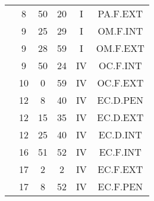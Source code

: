 \documentclass[12pt, a4paper]{article}
\begin{document}
\begin{multicols}{3}
{\begin{tabular}{c c c c c c}
	 	 	 	 & 8 & 50 & 20 & I & PA.F.EXT\\%
	 	 	 	 & 9 & 25 & 29 & I & OM.F.INT\\%
	 	 	 	 & 9 & 28 & 59 & I & OM.F.EXT\\%
	 	 	 	 & 9 & 50 & 24 & IV & OC.F.INT\\%
	 	 	 	 & 10 & 0 & 59 & IV & OC.F.EXT\\%
	 	 	 	 & 12 & 8 & 40 & IV & EC.D.PEN\\%
	 	 	 	 & 12 & 15 & 35 & IV & EC.D.EXT\\%
	 	 	 	 & 12 & 25 & 40 & IV & EC.D.INT\\%
	 	 	 	 & 16 & 51 & 52 & IV & EC.F.INT\\%
	 	 	 	 & 17 & 2 & 2 & IV & EC.F.EXT\\%
	 	 	 	 & 17 & 8 & 52 & IV & EC.F.PEN\\%
	 	 \end{tabular}
 	}
\end{multicols}
\end{document}
